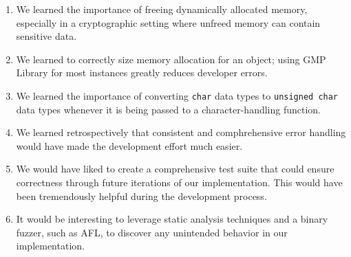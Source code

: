 \documentclass[letterpaper]{article}
\begin{document}
\begin{enumerate}
    \item We learned the importance of freeing dynamically allocated memory, especially in a cryptographic setting where unfreed memory can contain sensitive data.
        
    \item We learned to correctly size memory allocation for an object; using GMP Library for most instances greatly reduces developer errors.

    \item We learned the importance of converting {\tt char} data types to {\tt unsigned char} data types whenever it is being passed to a character-handling function.

    \item We learned retrospectively that consistent and comphrehensive error handling would have made the development effort much easier.

    \item We would have liked to create a comprehensive test suite that could ensure correctness through future iterations of our implementation. This would have been tremendously helpful during the development process.

    \item It would be interesting to leverage static analysis techniques and a binary fuzzer, such as AFL, to discover any unintended behavior in our implementation.
\end{enumerate}
\end{document}
